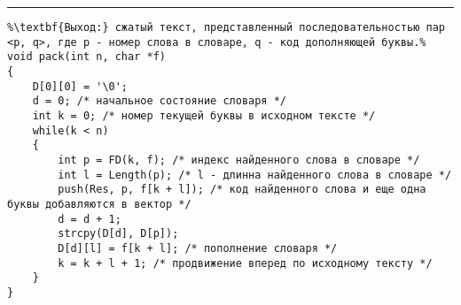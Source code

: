 \vspace{5pt} \hrule
\begin{lstlisting}[caption={Упаковка по методу Лемпела - Зива}, label=p229, escapechar=\%]
%\noindent\textbf{Вход:} исходный текст, заданный массивом кодов символов f: \textbf{array} [1..n] \textbf{of char}.\\%
%\textbf{Выход:} сжатый текст, представленный последовательностью пар <p, q>, где p - номер слова в словаре, q - код дополняющей буквы.%
void pack(int n, char *f)
{
	D[0][0] = '\0';
	d = 0; /* начальное состояние словаря */
	int k = 0; /* номер текущей буквы в исходном тексте */
	while(k < n)
	{
		int p = FD(k, f); /* индекс найденного слова в словаре */
		int l = Length(p); /* l - длинна найденного слова в словаре */
		push(Res, p, f[k + l]);	/* код найденного слова и еще одна буквы добавляются в вектор */
		d = d + 1;
		strcpy(D[d], D[p]);
		D[d][l] = f[k + l]; /* пополнение словаря */
		k = k + l + 1; /* продвижение вперед по исходному тексту */
	}
}
\end{lstlisting}
